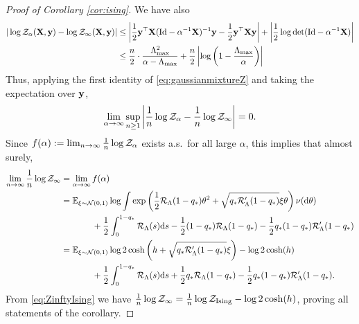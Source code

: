 \begin{proof}[Proof of Corollary \ref{cor:ising}]
We have also
\begin{align*}
|\log \mathcal{Z}_\alpha(\mathbf{X},\mathbf{y})-\log \mathcal{Z}_\infty(\mathbf{X},\mathbf{y})|
&\leq \left|\frac{1}{2}\mathbf{y}^\top \mathbf{X}(\mathrm{Id}-\alpha^{-1}\mathbf{X})^{-1}\mathbf{y}
-\frac{1}{2}\mathbf{y}^\top \mathbf{X}\mathbf{y}\right|
+\left|\frac{1}{2}\log \det(\mathrm{Id}-\alpha^{-1}\mathbf{X})\right|\\
&\leq \frac{n}{2} \cdot \frac{\Lambda_{\max}^2}{\alpha-\Lambda_{\max}}
+\frac{n}{2}\left|\log\left(1-\frac{\Lambda_{\max}}{\alpha}\right)\right|
\end{align*}
Thus, applying the first identity of \eqref{eq:gaussianmixtureZ} and
taking the expectation over $\mathbf{y}$,
\[\lim_{\alpha \to \infty} \sup_{n \geq 1}
\left|\frac{1}{n}\log \mathcal{Z}_\alpha-\frac{1}{n}\log \mathcal{Z}_\infty\right|=0.\]
Since $f(\alpha):=\lim_{n \to \infty} \frac{1}{n}\log \mathcal{Z}_\alpha$ exists
a.s.\ for all large $\alpha$, this implies that almost surely,
\begin{align*}
\lim_{n \to \infty} \frac{1}{n}\log \mathcal{Z}_\infty
&=\lim_{\alpha \to \infty} f(\alpha)\\
&=\mathbb{E}_{\xi \sim \mathcal{N}(0,1)}
\log \int \exp\left(\frac{1}{2}\mathcal{R}_\Lambda(1-q_*)\theta^2
+\sqrt{q_*\mathcal{R}_\Lambda'(1-q_*)}\xi\theta\right)\nu(\mathrm{d}\theta)\\
&\hspace{0.5in}
+\frac{1}{2}\int_0^{1-q_*} \mathcal{R}_\Lambda(s)\mathrm{d} s
-\frac{1}{2}(1-q_*)\mathcal{R}_\Lambda(1-q_*)
-\frac{1}{2}q_*(1-q_*)\mathcal{R}_\Lambda'(1-q_*)\\
&=\mathbb{E}_{\xi \sim \mathcal{N}(0,1)} \log 2\cosh
\left(h+\sqrt{q_*\mathcal{R}_\Lambda'(1-q_*)}\xi\right)
-\log 2\cosh(h)\\
&\hspace{0.5in}+\frac{1}{2}\int_0^{1-q_*} \mathcal{R}_\Lambda(s)\mathrm{d} s
+\frac{1}{2}q_*\mathcal{R}_\Lambda(1-q_*)-\frac{1}{2}q_*(1-q_*)\mathcal{R}_\Lambda'(1-q_*).
\end{align*}
From \eqref{eq:ZinftyIsing} we have
$\frac{1}{n}\log \mathcal{Z}_\infty=\frac{1}{n}\log \mathcal{Z}_\text{Ising}
-\log 2\cosh(h)$, proving all statements of the corollary.
\end{proof}
